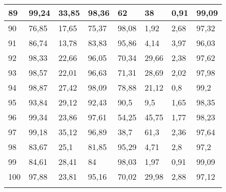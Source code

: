 \begin{longtable}[c]{|l|l|l|l|l|l|l|l|}
89              & 99,24        & 33,85        & 98,36       & 62            & 38            & 0,91          & 99,09         \\ \hline
90              & 76,85        & 17,65        & 75,37       & 98,08         & 1,92          & 2,68          & 97,32         \\ \hline
91              & 86,74        & 13,78        & 83,83       & 95,86         & 4,14          & 3,97          & 96,03         \\ \hline
92              & 98,33        & 22,66        & 96,05       & 70,34         & 29,66         & 2,38          & 97,62         \\ \hline
93              & 98,57        & 22,01        & 96,63       & 71,31         & 28,69         & 2,02          & 97,98         \\ \hline
94              & 98,87        & 27,42        & 98,09       & 78,88         & 21,12         & 0,8           & 99,2          \\ \hline
95              & 93,84        & 29,12        & 92,43       & 90,5          & 9,5           & 1,65          & 98,35         \\ \hline
96              & 99,34        & 23,86        & 97,61       & 54,25         & 45,75         & 1,77          & 98,23         \\ \hline
97              & 99,18        & 35,12        & 96,89       & 38,7          & 61,3          & 2,36          & 97,64         \\ \hline
98              & 83,67        & 25,1         & 81,85       & 95,29         & 4,71          & 2,8           & 97,2          \\ \hline
99              & 84,61        & 28,41        & 84          & 98,03         & 1,97          & 0,91          & 99,09         \\ \hline
100             & 97,88        & 23,81        & 95,16       & 70,02         & 29,98         & 2,88          & 97,12         \\ \hline
\label{anx:vazquez}
\end{longtable}
